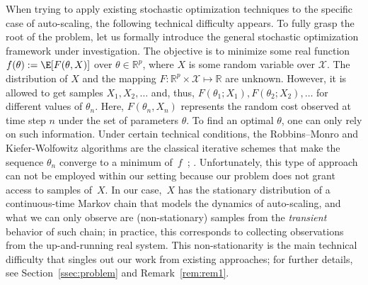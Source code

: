 When trying to apply existing stochastic optimization techniques to the specific case of auto-scaling, the following technical difficulty appears.
To fully grasp the root of the problem, let us formally introduce the general stochastic optimization framework under investigation.
The objective is to minimize some real function $f(\theta) := \E[F(\theta,X)]$ over $\theta \in \mathbb R^p$, where $X$ is some random variable over $\mathcal{X}$.
The distribution of $X$ and the mapping $F:\mathbb{R}^p \times \mathcal{X}\mapsto \mathbb{R}$ are unknown.
However, it is allowed to get samples $X_1,X_2,\dots$ and, thus, $F(\theta_1;X_1),F(\theta_2;X_2),\ldots$ for different values of $\theta_n$. Here, $F(\theta_n, X_n)$ represents the random cost observed at time step $n$ under the set of parameters $\theta$. To find an optimal $\theta$, one can only rely on such information.
Under certain technical conditions, the Robbins--Monro and Kiefer-Wolfowitz algorithms are the classical iterative schemes that make the sequence $\theta_n$ converge to a minimum of~$f$~\cite{borkar2008stochastic,Rasonyi_Tikosi_2023}; .
Unfortunately, this type of approach can not be employed within our setting because our problem does not grant access to samples of~$X$. In our case,~$X$ has the stationary distribution of a continuous-time Markov chain that models the dynamics of auto-scaling, and what we can only observe are (non-stationary) samples from the \emph{transient} behavior of such chain;
in practice, this corresponds to collecting observations from the up-and-running real system.
This non-stationarity is the main technical difficulty that singles out our work from existing approaches; for further details, see Section~\ref{ssec:problem} and Remark~\ref{rem:rem1}.

